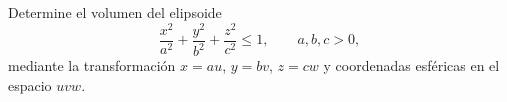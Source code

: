 Determine el volumen del elipsoide
\[
\frac{x^2}{a^2}+\frac{y^2}{b^2}+\frac{z^2}{c^2}\leq1,
\qquad a,b,c>0,
\]
mediante la transformación $x=au$, $y=bv$, $z=cw$ y coordenadas esféricas en el espacio $uvw$.
